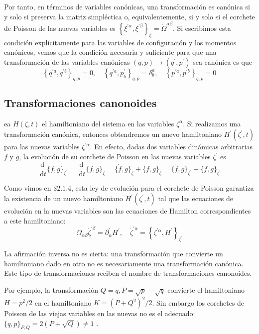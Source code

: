 Por tanto, en términos de variables canónicas, una transformación es canónica si y solo si preserva la matriz simpléctica o, equivalentemente, si y solo si el corchete de Poisson de las nuevas variables es $\left\{\xi^{\prime \alpha}, \xi^{\prime \beta}\right\}_{\xi}=\check{\Omega}^{\alpha \beta}$. Si escribimos esta condición explícitamente para las variables de configuración y los momentos canónicos, vemos que la condición necesaria y suficiente para que una transformación de las variables canónicas $(q, p) \rightarrow\left(q^{\prime}, p^{\prime}\right)$ sea canónica es que
$$
\left\{q^{\prime a}, q^{\prime b}\right\}_{q, p}=0, \quad\left\{q^{\prime a}, p_{b}^{\prime}\right\}_{q, p}=\delta_{b}^{a}, \quad\left\{p^{\prime a}, p^{\prime b}\right\}_{q, p}=0
$$
\subsection{Transformaciones canonoides}
ea $H(\zeta, t)$ el hamiltoniano del sistema en las variables $\zeta^{\alpha}$. Si realizamos una transformación canónica, entonces obtendremos un nuevo hamiltoniano $H^{\prime}\left(\zeta^{\prime}, t\right)$ para las nuevas variables $\zeta^{\prime \alpha}$. En efecto, dadas dos variables dinámicas arbitrarias $f$ y $g$, la evolución de su corchete de Poisson en las nuevas variables $\zeta^{\prime}$ es
$$
\frac{\mathrm{d}}{\mathrm{~d} t}\{f, g\}_{\zeta^{\prime}}=\frac{\mathrm{d}}{\mathrm{~d} t}\{f, g\}_{\zeta}=\{\dot{f}, g\}_{\zeta}+\{f, \dot{g}\}_{\zeta}=\{\dot{f}, g\}_{\zeta^{\prime}}+\{f, \dot{g}\}_{\zeta^{\prime}}
$$

Como vimos en $\$ 2.1$.4, esta ley de evolución para el corchete de Poisson garantiza la existencia de un nuevo hamiltoniano $H^{\prime}\left(\zeta^{\prime}, t\right)$ tal que las ecuaciones de evolución en la nuevas variables son las ecuaciones de Hamilton correspondientes a este hamiltoniano:
$$
\Omega_{\alpha \beta} \dot{\zeta}^{\prime \beta}=\partial_{\alpha}^{\prime} H^{\prime}, \quad \dot{\zeta}^{\prime \alpha}=\left\{\zeta^{\prime \alpha}, H^{\prime}\right\}_{\zeta^{\prime}}
$$

La afirmación inversa no es cierta: una transformación que convierte un hamiltoniano dado en otro no es necesariamente una transformación canónica. Este tipo de transformaciones reciben el nombre de transformaciones canonoides.

\begin{example}
  Por ejemplo, la transformación $Q=q, P=\sqrt{p}-\sqrt{q}$ convierte el hamiltoniano $H=p^{2} / 2$ en el hamiltoniano $K=\left(P+Q^{2}\right)^{2} / 2$. Sin embargo los corchetes de Poisson de las viejas variables en las nuevas no es el adecuado: $\{q, p\}_{P, Q}=2(P+\sqrt{Q}) \neq 1$ .
\end{example}

